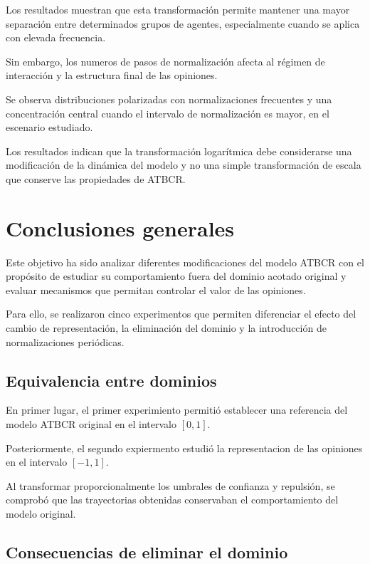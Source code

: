 \documentclass[11pt,a4paper]{article}
\begin{document}
Los resultados muestran que esta transformación permite mantener una mayor separación entre determinados grupos de agentes, especialmente cuando se aplica con elevada frecuencia.

Sin embargo, los numeros de pasos de normalización afecta al régimen de interacción y la estructura final de las opiniones.

Se observa distribuciones polarizadas con normalizaciones frecuentes y una concentración central cuando el intervalo de normalización es mayor, en el escenario estudiado.

Los resultados indican que la transformación logarítmica debe considerarse una modificación de la dinámica del modelo y no una simple transformación de escala que conserve las propiedades de ATBCR.



\section{Conclusiones generales}
\label{sec:paso0_conclusiones}

Este objetivo ha sido analizar diferentes modificaciones del modelo ATBCR con el propósito de estudiar su comportamiento fuera del dominio acotado original y evaluar mecanismos que permitan controlar el valor de las opiniones.

Para ello, se realizaron cinco experimentos que permiten diferenciar el efecto del cambio de representación, la eliminación del dominio y la introducción de normalizaciones periódicas.

\subsection{Equivalencia entre dominios}

En primer lugar, el primer experimiento permitió establecer una referencia del modelo ATBCR original en el intervalo $[0,1]$.

Posteriormente, el segundo expiermento estudió la representacion de las opiniones en el intervalo $[-1,1]$.

Al transformar proporcionalmente los umbrales de confianza y repulsión, se comprobó que las trayectorias obtenidas conservaban el comportamiento del modelo original.

\subsection{Consecuencias de eliminar el dominio}
\end{document}
